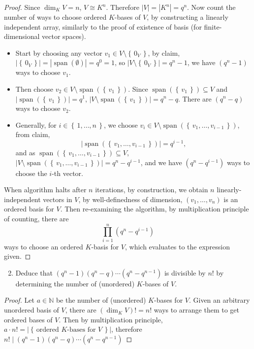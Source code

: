 \documentclass{article}
\theoremstyle{definition}
\numberwithin{lemma}{problem}
\numberwithin{equation}{problem}
\newcommand{\N}{\mathbb{N}}
\newcommand{\set}[1]{\left\{\,#1\,\right\}}
\DeclareMathOperator{\spn}{span}
\begin{document}
\begin{proof}
    Since $\dim_K V = n$, $V \cong K^n$.
    Therefore $|V| = |K^n| = q^n$.
    Now count the number of ways to choose ordered $K$-bases of $V$,
    by constructing a linearly independent array, similarly to
    the proof of existence of basis (for finite-dimensional vector spaces).
    \begin{itemize}
        \item Start by choosing any vector $v_1 \in V\setminus\set{0_V}$,
            by claim, $|\set{0_V}| = |\spn(\emptyset)| = q^0 = 1$,
            so
            $|V\setminus\set{0_V}| = q^n - 1$,
            we have $(q^n - 1)$ ways to choose $v_1$.
        \item Then choose $v_2 \in V\setminus\spn(\set{v_1})$.
            Since $\spn(\set{v_1}) \subseteq V$ and $|\spn(\set{v_1})| = q^1$,
            $|V\setminus\spn(\set{v_1})| = q^n- q$.
            There are $(q^n-q)$ ways to choose $v_2$.
        \item Generally, for $i\in\set{1,\dots,n}$,
            we choose $v_i \in V\setminus\spn(\set{v_1,\dots,v_{i-1}})$,
            from claim,
            $$|\spn(\set{v_1,\dots,v_{i-1}})| = q^{i-1},$$
            and as $\spn(\set{v_1,\dots,v_{i-1}}) \subseteq V$,
            $|V\setminus\spn(\set{v_1,\dots,v_{i-1}})| = q^n - q^{i-1}$,
            and we have $(q^n - q^{i-1})$ ways to choose the $i$-th vector.
    \end{itemize}
    When algorithm halts after $n$ iterations, by construction, we obtain
    $n$ linearly-independent vectors in $V$, by well-definedness of dimension,
    $(v_1,\dots,v_n)$ is an ordered basis for $V$.
    Then re-examining the algorithm, by multiplication principle of counting, there are
    $$ \prod_{i=1}^n (q^n - q^{i-1}) $$
    ways to choose an ordered $K$-basis for $V$, which evaluates to the expression given.
\end{proof}
\begin{enumerate}[label=(\alph*)] \setcounter{enumi}{1}
    \item Deduce that $(q^n-1)(q^n-q)\cdots(q^n-q^{n-1})$ is divisible by $n!$
        by determining the number of (unordered) $K$-bases of $V$.
\end{enumerate}
\begin{proof}
    Let $a\in \N$ be the number of (unordered) $K$-bases for $V$.
    Given an arbitrary unordered basis of $V$, there are $(\dim_K V)!= n!$ ways to arrange them to get ordered bases of $V$.
    Then by multiplication principle, $a\cdot n! = |\set{\text{ordered $K$-bases for $V$}}|$,
    therefore $n! \mid (q^n-1)(q^n-q)\cdots(q^n-q^{n-1})$
\end{proof}
\end{document}
